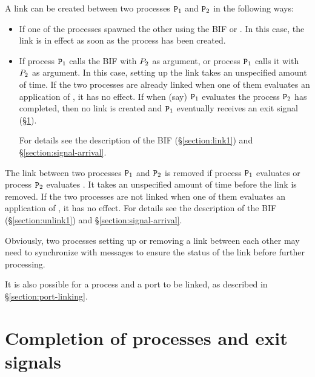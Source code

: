 A link can be created between two processes
${\tt{\sl P}}_1$ and ${\tt{\sl P}}_2$ in the following ways:
\begin{itemize}
\item If one of the processes spawned the other using the BIF
or .
In this case, the link is in effect as soon as the process has been created.
\item {}
If process ${\tt{\sl P}}_1$ calls the BIF 
with ${\sl P}_2$ as argument,
or process ${\tt{\sl P}}_1$ calls it with ${\sl P}_2$ as argument.
In this case, setting up the link takes an
unspecified amount of time.
If the two processes are already linked when one of them evaluates an application of
, it has no effect. If when (say) ${\tt{\sl P}}_1$ evaluates  the process
${\tt{\sl P}}_2$ has completed, then no link is created and ${\tt{\sl P}}_1$ eventually receives an exit signal
 (\S\ref{section:exit-signals}).

For details see the description of the BIF  (\S\ref{section:link1})
and \S\ref{section:signal-arrival}.
\end{itemize}
The link between two processes ${\tt{\sl P}}_1$ and ${\tt{\sl P}}_2$ is removed if process ${\tt{\sl P}}_1$ evaluates
 or process ${\tt{\sl P}}_2$ evaluates .  It takes an
unspecified amount of time before the link is removed.
If the two processes are not linked when one of them evaluates an application of
, it has no effect.
For details see the description of the BIF  (\S\ref{section:unlink1})
and \S\ref{section:signal-arrival}.

Obviously, two processes setting up or removing a link between each other may need to
synchronize with messages to ensure the status of the link before further processing.

It is also possible for a process and a port to be linked, as described in
\S\ref{section:port-linking}.

\section{Completion of processes and exit signals}

\label{section:exit-signals}

